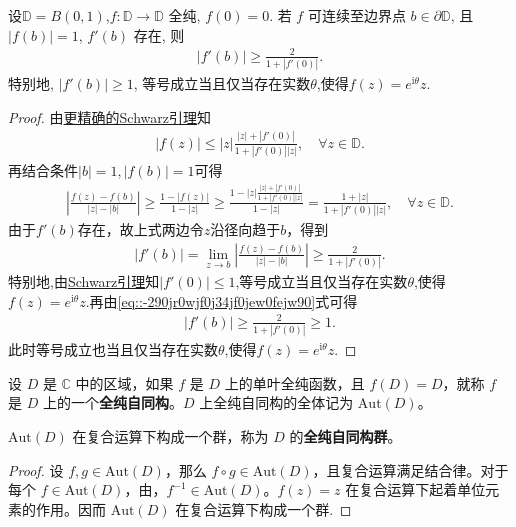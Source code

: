 \documentclass[../../main.tex]{subfiles}%
\begin{document}
\begin{theorem}[Osserman定理]\label{theorem:Osserman定理-2000年}
设\(\mathbb{D} = B(0,1) \),$f:\mathbb{D}\to\mathbb{D}$ 全纯, $f(0)=0$. 若 $f$ 可连续至边界点 $b\in\partial\mathbb{D}$, 且 $|f(b)|=1$, $f'(b)$ 存在, 则
\begin{align*}
|f'(b)|\geqslant \frac{2}{1+|f'(0)|}.
\end{align*}
特别地, $|f'(b)|\geqslant 1$, 等号成立当且仅当存在实数$\theta$,使得$f(z)=e^{\mathrm{i}\theta}z$.
\end{theorem}
\begin{proof}
由\hyperref[theorem:更精确的Schwarz引理]{更精确的Schwarz引理}知
\begin{align*}
|f(z)|\leqslant |z|\frac{|z|+|f'(0)|}{1+|f'(0)||z|},\quad \forall z\in\mathbb{D}.
\end{align*}
再结合条件$|b|=1,|f(b)|=1$可得
\begin{align*}
\left|\frac{f(z)-f(b)}{|z|-|b|}\right|\geqslant \frac{1-|f(z)|}{1-|z|}\geqslant \frac{1-|z|\frac{|z|+|f'(0)|}{1+|f'(0)||z|}}{1-|z|}=\frac{1+|z|}{1+|f'(0)||z|},\quad \forall z\in\mathbb{D}.
\end{align*}
由于$f'(b)$存在，故上式两边令$z$沿径向趋于$b$，得到
\begin{align}\label{eq::-290jr0wjf0j34jf0jew0fejw90}
|f'(b)|=\lim\limits_{z\rightarrow b}\left|\frac{f(z)-f(b)}{|z|-|b|}\right|\geqslant \frac{2}{1+|f'(0)|}.
\end{align}
特别地,由\hyperref[theorem:Schwarz引理-定理4.5.3]{Schwarz引理}知$|f'(0)|\leqslant 1$,等号成立当且仅当存在实数$\theta$,使得$f(z)=e^{\mathrm{i}\theta}z$.再由\eqref{eq::-290jr0wjf0j34jf0jew0fejw90}式可得
\begin{align*}
|f'(b)|\geqslant \frac{2}{1+|f'(0)|}\geqslant 1.
\end{align*}
此时等号成立也当且仅当存在实数$\theta$,使得$f(z)=e^{\mathrm{i}\theta}z$.
\end{proof}

\begin{definition}
设 \( D \) 是 \( \mathbb{C} \) 中的区域，如果 \( f \) 是 \( D \) 上的单叶全纯函数，且 \( f(D) = D \)，就称 \( f \) 是 \( D \) 上的一个\textbf{全纯自同构}。\( D \) 上全纯自同构的全体记为 \( \text{Aut}(D) \)。
\end{definition}

\begin{proposition}
\( \text{Aut}(D) \) 在复合运算下构成一个群，称为 \( D \) 的\textbf{全纯自同构群}。
\end{proposition}
\begin{proof}
设 \( f, g \in \text{Aut}(D) \)，那么 \( f \circ g \in \text{Aut}(D) \)，且复合运算满足结合律。对于每个 \( f \in \text{Aut}(D) \)，由，\( f^{-1} \in \text{Aut}(D) \)。\( f(z) = z \) 在复合运算下起着单位元素的作用。因而 \( \text{Aut}(D) \) 在复合运算下构成一个群.
\end{proof}
\end{document}
